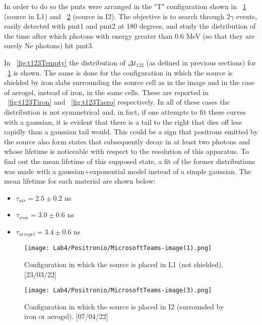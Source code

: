 \documentclass[10pt,a4paper,twocolumn]{article}
\begin{document}
In order to do so the pmts were arranged in the "T" configuration shown in \figurename~\ref{fig:TconfigL1} (source in L1) and \figurename~\ref{fig:TconfigI2} (source in I2). The objective is to search through $2\gamma$ events, easily detected with pmt1 and pmt2 at 180 degrees, and study the distribution of the time after which photons with energy greater than 0.6 MeV (so that they are surely Ne photons) hit pmt3. 



\noindent In \figurename~\ref{fig:t123Tempty} the distribution of $\Delta t_{123}$ (as defined in previous sections) for \figurename~\ref{fig:TconfigL1} is shown. The same is done for the configuration in which the source is shielded by iron slabs surrounding the source cell as in the image and in the case of aerogel, instead of iron, in the same cells. These are reported in \figurename~\ref{fig:t123Tiron} and \figurename~\ref{fig:t123Taero} respectively. In all of these cases the distribution is not symmetrical and, in fact, if one attempts to fit these curves with a gaussian, it is evident that there is a tail to the right that dies off less rapidly than a gaussian tail would. This could be a sign that positrons emitted by the source also form states that subsequently decay in at least two photons and whose lifetime is noticeable with respect to the resolution of this apparatus. To find out the mean lifetime of this supposed state, a fit of the former distributions was made with a gaussian+exponential model instead of a simple gaussian. The mean lifetime for each material are shown below:
\begin{itemize}
    \item $\tau_{air}=2.5 \pm 0.2$ ns
    \item $\tau_{iron}= 3.0 \pm 0.6$ ns
    \item $\tau_{aerogel}= 3.4 \pm 0.6$ ns
\end{itemize}

\begin{figure}[h!]
\centering
\texttt{[image: Lab4/Positronio/MicrosoftTeams-image(1).png]} 
\caption{Configuration in which the source is placed in L1 (not shielded). [23/03/22]}
\label{fig:TconfigL1}
\end{figure}

\begin{figure}[h!]
\centering
\texttt{[image: Lab4/Positronio/MicrosoftTeams-image(3).png]} 
\caption{Configuration in which the source is placed in I2 (surrounded by iron or aerogel). [07/04/22]}
\label{fig:TconfigI2}
\end{figure}
\end{document}
